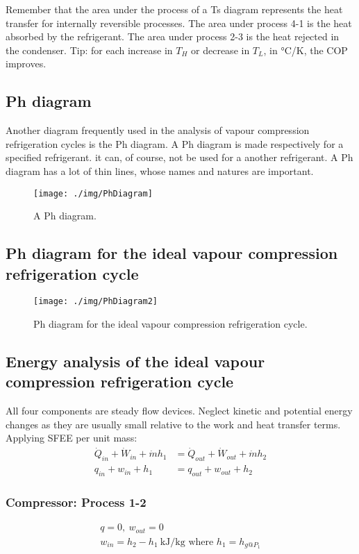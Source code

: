 Remember that the area under the process of a Ts diagram represents the heat transfer for internally reversible processes. The area under process 4-1 is the heat absorbed by the refrigerant. The area under process 2-3 is the heat rejected in the condenser. Tip: for each increase in $T_H$ or decrease in $T_L$, in \si{\celsius}/\si{\kelvin}, the COP improves.
\subsection{Ph diagram}
Another diagram frequently used in the analysis of vapour compression refrigeration cycles is the Ph diagram. A Ph diagram is made respectively for a specified refrigerant. it can, of course, not be used for a another refrigerant. A Ph diagram has a lot of thin lines, whose names and natures are important.
\begin{figure}
  \centering
  \texttt{[image: ./img/PhDiagram]}
  \caption{A Ph diagram.}
\end{figure}
\subsection{Ph diagram for the ideal vapour compression refrigeration cycle}
\begin{figure}
  \centering
  \texttt{[image: ./img/PhDiagram2]}
  \caption{Ph diagram for the ideal vapour compression refrigeration cycle.}
\end{figure}
\subsection{Energy analysis of the ideal vapour compression refrigeration cycle}
All four components are steady flow devices. Neglect kinetic and potential energy changes as they are usually small relative to the work and heat transfer terms. Applying SFEE per unit mass:
\begin{align}
  \dot{Q}_{in} + \dot{W}_{in} + \dot{m} h_1 & = \dot{Q}_{out} + \dot{W}_{out} + \dot{m} h_2 \\
  q_{in} + w_{in} + h_1                     & = q_{out} + w_{out} + h_2
\end{align}
\subsubsection{Compressor: Process 1-2}
\begin{gather}
  q = 0, \ w_{out} = 0\\
  w_{in} = h_2 - h_1 \ \si{\kilo\joule\per\kg} \textrm{ where } h_1 = h_{g@P_1}
\end{gather}
